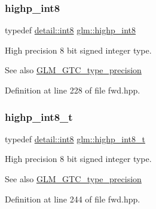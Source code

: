 \subsubsection{\texorpdfstring{highp\+\_\+int8}{highp\_int8}}
{\footnotesize\ttfamily typedef \hyperlink{namespaceglm_1_1detail_a04b526a8d7a9b455602a0afa78c531e0}{detail\+::int8} \hyperlink{group__gtc__type__precision_ga57c86999e666760c304453f9bfdc09d1}{glm\+::highp\+\_\+int8}}

High precision 8 bit signed integer type. \begin{DoxySeeAlso}{See also}
\hyperlink{group__gtc__type__precision}{G\+L\+M\+\_\+\+G\+T\+C\+\_\+type\+\_\+precision} 
\end{DoxySeeAlso}


Definition at line 228 of file fwd.\+hpp.

\mbox{\label{group__gtc__type__precision_ga417701b99e6e7992f35ab2ef694f88b2}} 
\subsubsection{\texorpdfstring{highp\+\_\+int8\+\_\+t}{highp\_int8\_t}}
{\footnotesize\ttfamily typedef \hyperlink{namespaceglm_1_1detail_a04b526a8d7a9b455602a0afa78c531e0}{detail\+::int8} \hyperlink{group__gtc__type__precision_ga417701b99e6e7992f35ab2ef694f88b2}{glm\+::highp\+\_\+int8\+\_\+t}}

High precision 8 bit signed integer type. \begin{DoxySeeAlso}{See also}
\hyperlink{group__gtc__type__precision}{G\+L\+M\+\_\+\+G\+T\+C\+\_\+type\+\_\+precision} 
\end{DoxySeeAlso}


Definition at line 244 of file fwd.\+hpp.

\mbox{\label{group__gtc__type__precision_ga9da2178d7501d9c0f225fa1a7b70cb45}} 
